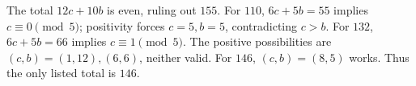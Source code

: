 The total $12c+10b$ is even, ruling out $155$. For $110$, $6c+5b=55$ implies $c\equiv0\pmod5$; positivity forces $c=5,b=5$, contradicting $c>b$. For $132$, $6c+5b=66$ implies $c\equiv1\pmod5$. The positive possibilities are $(c,b)=(1,12),(6,6)$, neither valid. For $146$, $(c,b)=(8,5)$ works. Thus the only listed total is $\boxed{146}$.
